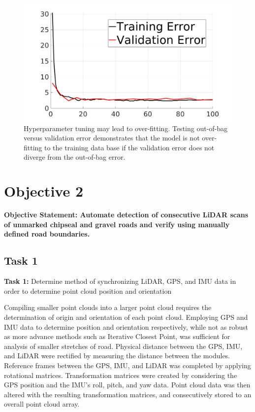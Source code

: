 \documentclass[numbered,pdftex]{ohio-etd}
\begin{document}
{{{{				\begin{figure}[H]
					\centering
					\includegraphics[width=0.75\linewidth]{Defense_Images/train_vs_valid_overfit_test2}
					\caption[Training vs Validation Error]{Hyperparameter tuning may lead to over-fitting. Testing out-of-bag versus validation error demonstrates that the model is not over-fitting to the training data base if the validation error does not diverge from the out-of-bag error.}
					\label{fig:train_vs_valid_overfit_test2}
				\end{figure}
					


			} %
			
				
		} %

	} %


\newpage
	
	\section{Objective 2}\label{sec:objective-2}
	
		{
		
		\textbf{Objective Statement: Automate detection of consecutive LiDAR scans of unmarked chipseal and gravel roads and verify using manually defined road boundaries.}
		
		\subsection{Task 1}{
		
			\textbf{Task 1: }{Determine method of synchronizing LiDAR, GPS, and IMU data in order to determine point cloud position and orientation}
		
				{Compiling smaller point clouds into a larger point cloud requires the determination of origin and orientation of each point cloud. Employing GPS and IMU data to determine position and orientation respectively, while not as robust as more advance methods such as Iterative Closest Point, was sufficient for analysis of smaller stretches of road. Physical distance between the GPS, IMU, and LiDAR were rectified by measuring the distance between the modules. Reference frames between the GPS, IMU, and LiDAR was completed by applying rotational matrices. Transformation matrices were created by considering the GPS position and the IMU's roll, pitch, and yaw data. Point cloud data was then altered with the resulting transformation matrices, and consecutively stored to an overall point cloud array.}
			
}}}
\end{document}
